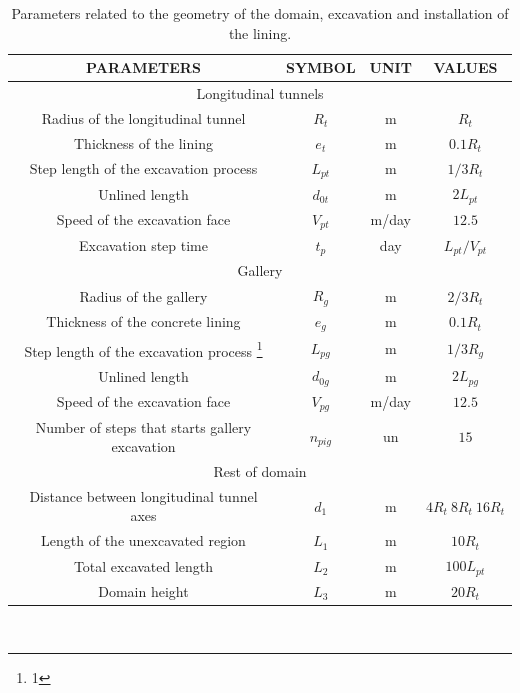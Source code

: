 \documentclass[a4paper,fleqn]{cas-sc}
\begin{document}
\begin{table}
	\caption{Parameters related to the geometry of the domain, excavation and installation of the lining.}
	\label{table1}
	\centering
	\renewcommand{\arraystretch}{1.25}
	\begin{tabular}{c c c c}
		\hline
		\multicolumn{1}{c}{PARAMETERS} &
		\multicolumn{1}{c}{SYMBOL} &
		\multicolumn{1}{c}{UNIT} &
		\multicolumn{1}{c}{VALUES} \\
		\hline
		\multicolumn{4}{c}{Longitudinal tunnels} \\
		\hline
		Radius of the longitudinal tunnel & $R_t$ & m & $R_t$ \\
		Thickness of the lining & $e_t$ & m & $0.1R_t$ \\
		Step length of the excavation process & $L_{pt}$ & m & $1/3R_t$ \\
		Unlined length & $d_{0t}$ & m & $2L_{pt}$ \\
		Speed of the excavation face & $V_{pt}$ & m/day & $12.5$ \\
		Excavation step time & $t_p$ & day & $L_{pt}/V_{pt}$ \\
		\hline
		\multicolumn{4}{c}{Gallery} \\
		\hline
		Radius of the gallery & $R_{g}$ & m & $2/3R_t$ \\
		Thickness of the concrete lining & $e_g$ & m & $0.1R_t$ \\
		Step length of the excavation process \footnote{1} & $L_{pg}$ & m & $1/3R_g$ \\
		Unlined length & $d_{0g}$ & m & $2L_{pg}$ \\
		Speed of the excavation face & $V_{pg}$ & m/day & $12.5$ \\
		Number of steps that starts gallery excavation & $n_{pig}$ & un & $15$ \\
		\hline
		\multicolumn{4}{c}{Rest of domain} \\
		\hline
		Distance between longitudinal tunnel axes & $d_1$ & m & $4R_t ~8R_t ~16R_t$ \\
		Length of the unexcavated region & $L_1$ & m & $10R_t$ \\
		Total excavated length & $L_2$ & m & $100L_{pt}$ \\
		Domain height & $L_3$ & m & $20R_t$ \\
		\hline
	\end{tabular}
	\normalsize
	\\ 
\end{table}
\end{document}
